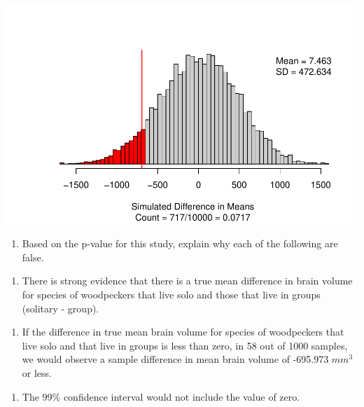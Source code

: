 \documentclass[
]{report}
\providecommand{\tightlist}{%
  \setlength{\itemsep}{0pt}\setlength{\parskip}{0pt}}
\begin{document}
\begin{center}\includegraphics[width=0.7\linewidth]{14-UR-module12_review_files/figure-latex/unnamed-chunk-3-1} \end{center}

\begin{enumerate}
\def\labelenumi{\arabic{enumi}.}
\setcounter{enumi}{4}
\tightlist
\item
  Based on the p-value for this study, explain why each of the following are false.
\end{enumerate}

\begin{enumerate}
\def\labelenumi{\Alph{enumi}.}
\tightlist
\item
  There is strong evidence that there is a true mean difference in brain volume for species of woodpeckers that live solo and those that live in groups (solitary - group).
\end{enumerate}

\vspace{0.5in}

\begin{enumerate}
\def\labelenumi{\Alph{enumi}.}
\setcounter{enumi}{1}
\tightlist
\item
  If the difference in true mean brain volume for species of woodpeckers that live solo and that live in groups is less than zero, in 58 out of 1000 samples, we would observe a sample difference in mean brain volume of -695.973 \(mm^3\) or less.
\end{enumerate}

\vspace{0.5in}

\begin{enumerate}
\def\labelenumi{\Alph{enumi}.}
\setcounter{enumi}{2}
\tightlist
\item
  The 99\% confidence interval would not include the value of zero.
\end{enumerate}
\end{document}
